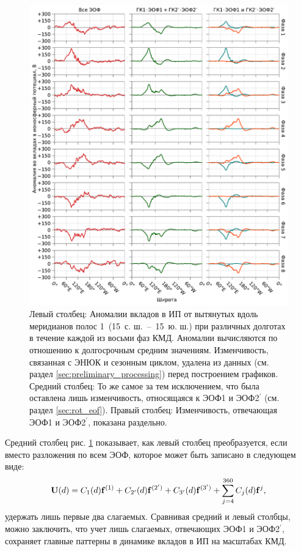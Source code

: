 \begin{figure}[htbp]
    \centering
    \includegraphics[width=\textwidth]{figures/longitudinal_structure.pdf}
    \caption{Левый столбец: Аномалии вкладов в ИП от вытянутых вдоль меридианов полос 1\textdegree{}\textdegree\ (15\textdegree\ с. ш.~--~15\textdegree\ ю. ш.) при различных долготах в течение каждой из восьми фаз КМД. Аномалии вычисляются по отношению к долгосрочным средним значениям. Изменчивость, связанная с ЭНЮК и сезонным циклом, удалена из данных (см. раздел \ref{sec:preliminary_processing}) перед построением графиков. Средний столбец: То же самое за тем исключением, что была оставлена лишь изменчивость, относящаяся к ЭОФ1 и ЭОФ2$^\prime$ (см. раздел \ref{sec:rot_eof}). Правый столбец: Изменчивость, отвечающая ЭОФ1 и ЭОФ2$^\prime$, показана раздельно.}
    \label{fig:longitudinal_structure}
\end{figure}

Средний столбец рис. \ref{fig:longitudinal_structure} показывает, как левый столбец преобразуется, если вместо разложения по всем ЭОФ, которое может быть записано в следующем виде:
\begin{equation}
    \vb{U}(d) = C_1(d) \vb{f}^{(1)} + C_{2'}(d) \vb{f}^{(2')} + C_{3'}(d) \vb{f}^{(3')} + \sum\limits_{j=4}^{360} C_j(d) \vb{f}^{j},
\end{equation}
удержать лишь первые два слагаемых. Сравнивая средний и левый столбцы, можно заключить, что учет лишь слагаемых, отвечающих ЭОФ1 и ЭОФ2$^\prime$, сохраняет главные паттерны в динамике вкладов в ИП на масштабах КМД.

